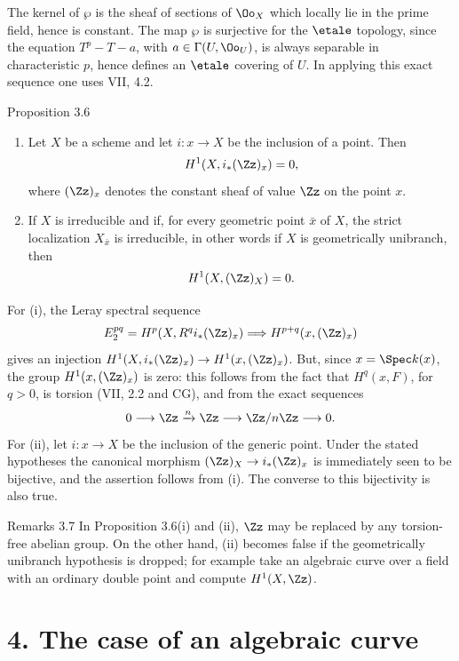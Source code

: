 The kernel of \(\wp\) is the sheaf of sections of \(\Oo_X\) which locally lie in the prime field, hence is constant. The map \(\wp\) is surjective for the \(\etale\) topology, since the equation \(T^p-T-a\), with \(a\in\Gamma(U,\Oo_U)\), is always separable in characteristic \(p\), hence defines an \(\etale\) covering of \(U\). In applying this exact sequence one uses VII, 4.2.

\begin{statement}{Proposition 3.6}
\begin{enumerate}[label=(\roman*)]
\item Let \(X\) be a scheme and let \(i:x\to X\) be the inclusion of a point. Then
\[
H^1(X,i_*(\Zz)_x)=0,
\]
where \((\Zz)_x\) denotes the constant sheaf of value \(\Zz\) on the point \(x\).
\item If \(X\) is irreducible and if, for every geometric point \(\bar x\) of \(X\), the strict localization \(X_{\bar x}\) is irreducible, in other words if \(X\) is geometrically unibranch, then
\[
H^1(X,(\Zz)_X)=0.
\]
\end{enumerate}
\end{statement}

\begin{prooftext}
For (i), the Leray spectral sequence
\[
E_2^{pq}=H^p(X,R^qi_*(\Zz)_x)\Longrightarrow H^{p+q}(x,(\Zz)_x)
\]
gives an injection \(H^1(X,i_*(\Zz)_x)\to H^1(x,(\Zz)_x)\). But, since \(x=\Spec k(x)\), the group \(H^1(x,(\Zz)_x)\) is zero: this follows from the fact that \(H^q(x,F)\), for \(q>0\), is torsion (VII, 2.2 and CG), and from the exact sequences
\[
0\longrightarrow \Zz\xrightarrow{n}\Zz\longrightarrow \Zz/n\Zz\longrightarrow 0.
\]
For (ii), let \(i:x\to X\) be the inclusion of the generic point. Under the stated hypotheses the canonical morphism \((\Zz)_X\to i_*(\Zz)_x\) is immediately seen to be bijective, and the assertion follows from (i). The converse to this bijectivity is also true.
\end{prooftext}

\begin{remarktext}{Remarks 3.7}
In Proposition 3.6(i) and (ii), \(\Zz\) may be replaced by any torsion-free abelian group. On the other hand, (ii) becomes false if the geometrically unibranch hypothesis is dropped; for example take an algebraic curve over a field with an ordinary double point and compute \(H^1(X,\Zz)\).
\end{remarktext}

\section*{4. The case of an algebraic curve}

